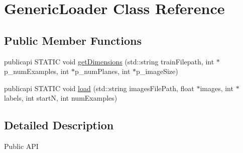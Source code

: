\hypertarget{classGenericLoader}{\section{Generic\-Loader Class Reference}
\label{classGenericLoader}
}
\subsection*{Public Member Functions}
\begin{DoxyCompactItemize}
\item 
publicapi S\-T\-A\-T\-I\-C void \hyperlink{classGenericLoader_aedf07f7f05373a7347d5e1d17ccc58c3}{get\-Dimensions} (std\-::string train\-Filepath, int $\ast$p\-\_\-num\-Examples, int $\ast$p\-\_\-num\-Planes, int $\ast$p\-\_\-image\-Size)
\item 
publicapi S\-T\-A\-T\-I\-C void \hyperlink{classGenericLoader_ae628e58147a15c3aa83a3f50facdbdcb}{load} (std\-::string images\-File\-Path, float $\ast$images, int $\ast$labels, int start\-N, int num\-Examples)
\end{DoxyCompactItemize}


\subsection{Detailed Description}
\begin{DoxyParagraph}{Public A\-P\-I}

\end{DoxyParagraph}


